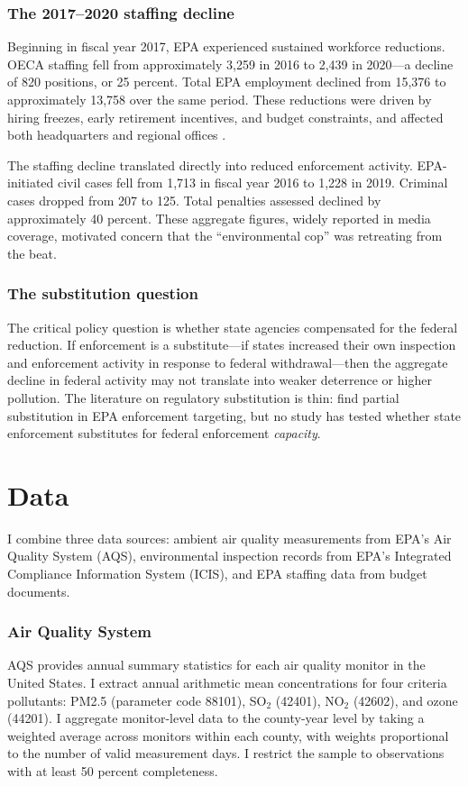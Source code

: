 \documentclass[12pt]{article}
\begin{document}
\subsubsection*{The 2017--2020 staffing decline} Beginning in fiscal year 2017, EPA experienced sustained workforce reductions. OECA staffing fell from approximately 3,259 in 2016 to 2,439 in 2020---a decline of 820 positions, or 25 percent. Total EPA employment declined from 15,376 to approximately 13,758 over the same period. These reductions were driven by hiring freezes, early retirement incentives, and budget constraints, and affected both headquarters and regional offices \citep{vig2019environmental}.

The staffing decline translated directly into reduced enforcement activity. EPA-initiated civil cases fell from 1,713 in fiscal year 2016 to 1,228 in 2019. Criminal cases dropped from 207 to 125. Total penalties assessed declined by approximately 40 percent. These aggregate figures, widely reported in media coverage, motivated concern that the ``environmental cop'' was retreating from the beat.

\subsubsection*{The substitution question} The critical policy question is whether state agencies compensated for the federal reduction. If enforcement is a substitute---if states increased their own inspection and enforcement activity in response to federal withdrawal---then the aggregate decline in federal activity may not translate into weaker deterrence or higher pollution. The literature on regulatory substitution is thin: \citet{helland1998effects} find partial substitution in EPA enforcement targeting, but no study has tested whether state enforcement substitutes for federal enforcement \textit{capacity}.

\section{Data}\label{sec:data}

I combine three data sources: ambient air quality measurements from EPA's Air Quality System (AQS), environmental inspection records from EPA's Integrated Compliance Information System (ICIS), and EPA staffing data from budget documents.

\subsubsection*{Air Quality System} AQS provides annual summary statistics for each air quality monitor in the United States. I extract annual arithmetic mean concentrations for four criteria pollutants: PM2.5 (parameter code 88101), SO$_2$ (42401), NO$_2$ (42602), and ozone (44201). I aggregate monitor-level data to the county-year level by taking a weighted average across monitors within each county, with weights proportional to the number of valid measurement days. I restrict the sample to observations with at least 50 percent completeness.
\end{document}
